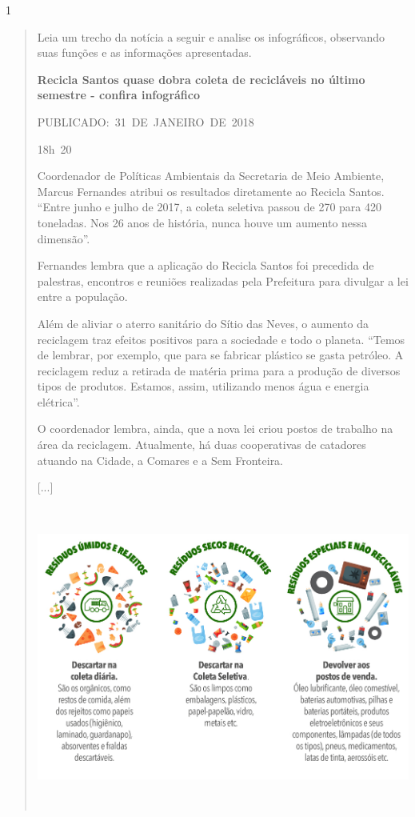 \begin{escolha}
\begin{escolha}
{\num{1}

\begin{quote}
Leia um trecho da notícia a seguir e analise os infográficos, observando
suas funções e as informações apresentadas.

\textbf{Recicla Santos quase dobra coleta de recicláveis no último
semestre - confira infográfico}

PUBLICADO:~31~DE~JANEIRO~DE~2018~

18h~20

Coordenador de Políticas Ambientais da Secretaria de Meio Ambiente,
Marcus Fernandes atribui os resultados diretamente ao Recicla Santos.
``Entre junho e julho de 2017, a coleta seletiva passou de 270 para 420
toneladas. Nos 26 anos de história, nunca houve um aumento nessa
dimensão''.

Fernandes lembra que a aplicação do Recicla Santos foi precedida de
palestras, encontros e reuniões realizadas pela Prefeitura para divulgar
a lei entre a população.

Além de aliviar o aterro sanitário do Sítio das Neves, o aumento da
reciclagem traz efeitos positivos para a sociedade e todo o planeta.
``Temos de lembrar, por exemplo, que para se fabricar plástico se gasta
petróleo. A reciclagem reduz a retirada de matéria prima para a produção
de diversos tipos de produtos. Estamos, assim, utilizando menos água e
energia elétrica''.

O coordenador lembra, ainda, que a nova lei criou postos de trabalho na
área da reciclagem. Atualmente, há duas cooperativas de catadores
atuando na Cidade, a Comares e a Sem Fronteira.

{[}...{]}

\includegraphics[width=5.90556in,height=3.90764in]{media/image30.jpeg}


\end{quote}}
\end{escolha}
\end{escolha}
